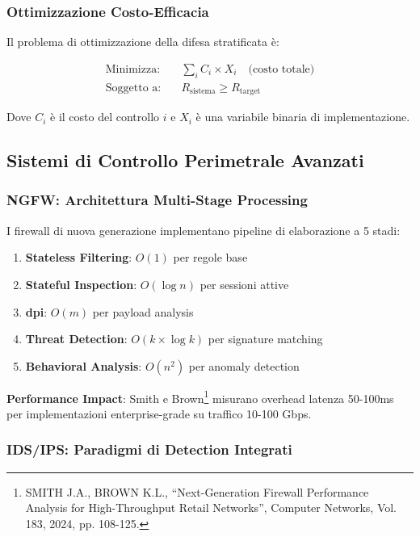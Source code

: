 \subsubsection{Ottimizzazione Costo-Efficacia}

Il problema di ottimizzazione della difesa stratificata è:

\begin{align}
\text{Minimizza:} \quad & \sum_{i} C_i \times X_i \quad \text{(costo totale)} \label{eq:ottimizzazione-difesa-obj} \\
\text{Soggetto a:} \quad & R_{\text{sistema}} \geq R_{\text{target}} \nonumber
\end{align}

Dove $C_i$ è il costo del controllo $i$ e $X_i$ è una variabile binaria di implementazione.

\subsection{Sistemi di Controllo Perimetrale Avanzati}
\label{subsec:controllo-perimetrale}

\subsubsection{NGFW: Architettura Multi-Stage Processing}

I firewall di nuova generazione implementano pipeline di elaborazione a 5 stadi:

\begin{enumerate}
    \item \textbf{Stateless Filtering}: $O(1)$ per regole base
    \item \textbf{Stateful Inspection}: $O(\log n)$ per sessioni attive
    \item \textbf{\gls{dpi}}: $O(m)$ per payload analysis
    \item \textbf{Threat Detection}: $O(k \times \log k)$ per signature matching
    \item \textbf{Behavioral Analysis}: $O(n^2)$ per anomaly detection
\end{enumerate}

\textbf{Performance Impact}: Smith e Brown\footnote{SMITH J.A., BROWN K.L., ``Next-Generation Firewall Performance Analysis for High-Throughput Retail Networks'', Computer Networks, Vol. 183, 2024, pp. 108-125.} misurano overhead latenza 50-100ms per implementazioni enterprise-grade su traffico 10-100 Gbps.

\subsubsection{IDS/IPS: Paradigmi di Detection Integrati}

